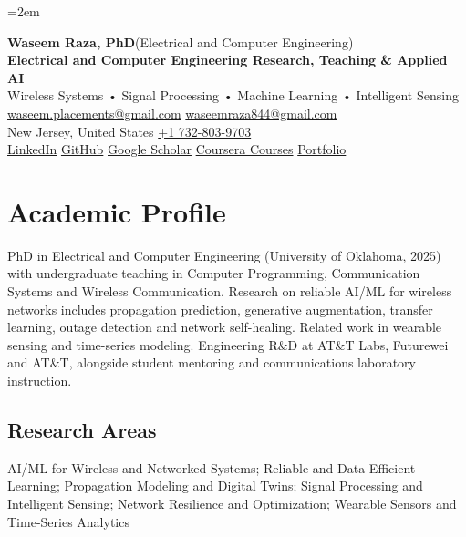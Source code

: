 \documentclass[9pt,letterpaper]{extarticle}
\begin{document}
\emergencystretch=2em
\begin{center}
{\LARGE\bfseries Waseem Raza, PhD}{\normalsize\mdseries \enspace (Electrical and Computer Engineering)}\\[2pt]
{\large\bfseries Electrical and Computer Engineering \textbar{} Research, Teaching \& Applied AI}\\[1pt]
{\small Wireless Systems • Signal Processing • Machine Learning • Intelligent Sensing}\\[3pt]
{\footnotesize {}\enspace \href{mailto:waseem.placements@gmail.com}{waseem.placements@gmail.com} \textbar{} \href{mailto:waseemraza844@gmail.com}{waseemraza844@gmail.com}\\[1pt]New Jersey, United States \quad {}\enspace \href{tel:+17328039703}{+1 732-803-9703}\\[1pt]\href{https://www.linkedin.com/in/waseem-raza-phd-9a737858/}{LinkedIn} \textbar{} \href{https://github.com/WaseemRaza844}{GitHub} \textbar{} \href{https://scholar.google.com/citations?user=d58Drr0AAAAJ\&hl=en}{Google Scholar} \textbar{} \href{https://waseemraza844.github.io/portfolio/learning.html}{Coursera Courses} \textbar{} \href{https://waseemraza844.github.io/portfolio/}{Portfolio}}
\end{center}
\vspace{-5pt}
\section{Academic Profile}
PhD in Electrical and Computer Engineering (University of Oklahoma, 2025) with undergraduate teaching in Computer Programming, Communication Systems and Wireless Communication. Research on reliable AI/ML for wireless networks includes propagation prediction, generative augmentation, transfer learning, outage detection and network self-healing. Related work in wearable sensing and time-series modeling. Engineering R\&D at AT\&T Labs, Futurewei and AT\&T, alongside student mentoring and communications laboratory instruction.
\subsection{Research Areas}
AI/ML for Wireless and Networked Systems; Reliable and Data-Efficient Learning; Propagation Modeling and Digital Twins; Signal Processing and Intelligent Sensing; Network Resilience and Optimization; Wearable Sensors and Time-Series Analytics\par
{}
\end{document}

